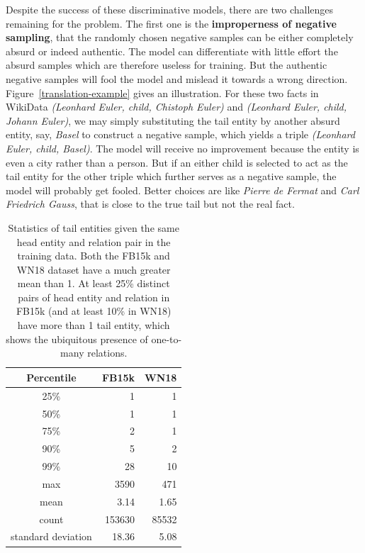 \documentclass[twocolumn,a4paper,preprint,10pt,3p]{elsarticle}
\begin{document}
Despite the success of these discriminative models, there are two challenges remaining for the problem.
The first one is the \textbf{improperness of negative sampling}, that the randomly chosen negative samples can be either completely absurd or indeed authentic.
The model can differentiate with little effort the absurd samples which are therefore useless for training. But the authentic negative samples will fool the model and mislead it towards a wrong direction. Figure~\ref{translation-example} gives an illustration. For these two facts in WikiData \emph{(Leonhard Euler, child, Chistoph Euler)} and \emph{(Leonhard Euler, child, Johann Euler)}, we may simply substituting the tail entity by another absurd entity, say, \emph{Basel} to construct a negative sample, which yields a triple \emph{(Leonhard Euler, child, Basel)}. The model will receive no improvement because the entity is even a city rather than a person. But if an either child is selected to act as the tail entity for the other triple which further serves as a negative sample, the model will probably get fooled. Better choices are like \emph{Pierre de Fermat} and \emph{Carl Friedrich Gauss}, that is close to the true tail but not the real fact.

\begin{table}
    \centering
    \begin{tabular}{c|r|r}
        \toprule
        Percentile & FB15k & WN18 \\
        \midrule
        25\% &  1   & 1  \\
        50\% &  1   & 1 \\
        75\% &  2   & 1 \\
        90\% &  5   & 2 \\
        99\% &  28  & 10 \\
        max & 3590  &  471 \\
        \midrule
        mean &  3.14 & 1.65 \\
        count & 153630 & 85532 \\
        standard deviation & 18.36 & 5.08 \\
        \bottomrule
    \end{tabular}
    \caption{Statistics of tail entities given the same head entity and relation pair in the training data. Both the FB15k and WN18 dataset have a much greater mean than 1. At least 25\% distinct pairs of head entity and relation in FB15k (and at least 10\% in WN18) have more than 1 tail entity, which shows the ubiquitous presence of one-to-many relations. }
\label{one-to-many}
\end{table}
\end{document}
